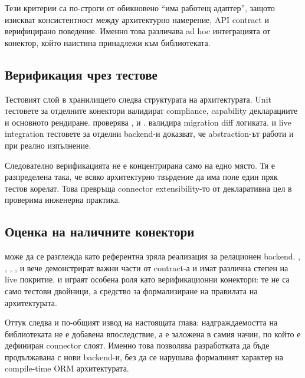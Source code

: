 Тези критерии са по-строги от обикновено ``има работещ адаптер'', защото изискват консистентност между архитектурно намерение, API contract и верифицирано поведение. Именно това различава ad hoc интеграцията от конектор, който наистина принадлежи към библиотеката.

\subsection{Верификация чрез тестове}

Тестовият слой в хранилището следва структурата на архитектурата. Unit тестовете за отделните конектори валидират  compliance, capability декларациите и основното рендиране.  проверява ,  и .  валидира migration diff логиката.  и live integration тестовете за отделни backend-и доказват, че abstraction-ът работи и при реално изпълнение.

Следователно верификацията не е концентрирана само на едно място. Тя е разпределена така, че всяко архитектурно твърдение да има поне един пряк тестов корелат. Това превръща connector extensibility-то от декларативна цел в проверима инженерна практика.

\subsection{Оценка на наличните конектори}

 може да се разглежда като референтна зряла реализация за релационен backend. , , , ,  и  вече демонстрират важни части от contract-а и имат различна степен на live покритие.  и  играят особена роля като верификационни конектори: те не са само тестови двойници, а средство за формализиране на правилата на архитектурата.

Оттук следва и по-общият извод на настоящата глава: надграждаемостта на библиотеката не е добавена впоследствие, а е заложена в самия начин, по който е дефиниран connector слоят. Именно това позволява разработката да бъде продължавана с нови backend-и, без да се нарушава формалният характер на compile-time ORM архитектурата.
